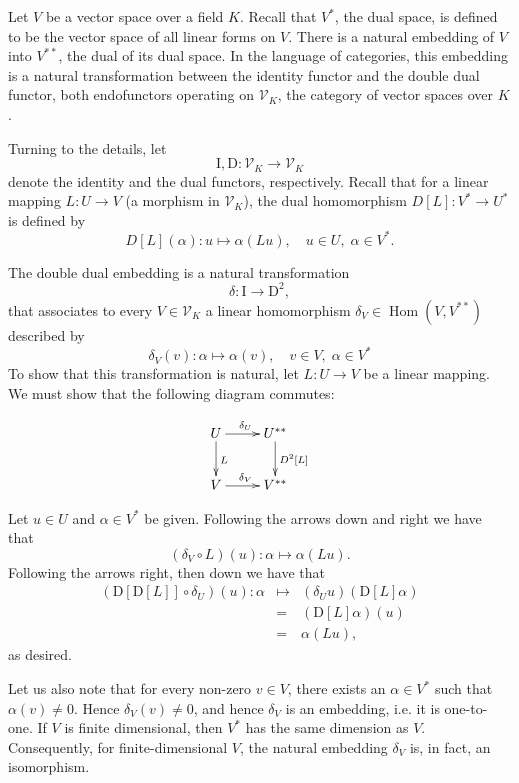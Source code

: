\documentclass[12pt]{article}
\begin{document}


\newcommand{\rI}{\mathrm{I}}
\newcommand{\rD}{\mathrm{D}}
\newcommand{\cV}{\mathcal{V}}
\newcommand{\Hom}{\operatorname{Hom}}

Let $V$ be a vector space over a field $K$.  Recall that $V^*$, the
dual space, is defined to be the vector space of all linear forms on
$V$.  There is a natural embedding of $V$ into $V^{**}$, the dual of
its dual space.  In the language of categories, this embedding is a
natural transformation between the identity functor and the double
dual functor, both endofunctors operating on $\mathcal{V}_K$, the category of
vector spaces over $K$.

Turning to the details, let 
\[\rI, \rD:\cV_K\rightarrow \cV_K\]
denote the identity and the dual functors, respectively.  Recall that for a
linear mapping $L:U\rightarrow V$ (a morphism in $\cV_K$), the dual
homomorphism $D[L]:V^*\rightarrow U^*$ is defined by
\[ D[L](\alpha): u \mapsto \alpha(Lu),\quad u\in U,\; \alpha\in V^*.\]

The double dual embedding is a natural transformation
\[\delta:\rI\rightarrow \rD^2,\]
that associates to every $V\in \cV_K$ a linear homomorphism
$\delta_V\in\operatorname{Hom}(V,V^{**})$ described by
\[\delta_V(v): \alpha\mapsto \alpha(v),\quad v\in V,\;\alpha\in V^*\]
To show that this transformation is natural, let $L:U\rightarrow
V$ be a linear mapping.  We must show that the following diagram
commutes:

$$
\xymatrix{%
U \ar[r]^{\delta_U} \ar[d]^L & U^{**} \ar[d]^{D^2[L]} \\
V \ar[r]^{\delta_V} & V^{**}
}
$$

Let $u\in U$ and $\alpha\in V^*$ be given.  Following the arrows down
and right we have that
$$(\delta_V\circ L)(u): \alpha\mapsto \alpha(Lu).$$
Following the arrows right, then down we have that
\begin{eqnarray*}
(\rD[\rD[L]]\circ \delta_U)(u):
\alpha &\mapsto& (\delta_U u)(\rD[L]\alpha) \\
&=& (\rD[L]\alpha)(u) \\
&=& \alpha(Lu),
\end{eqnarray*}
as desired.

Let us also note that for every non-zero $v\in V$, there exists an
$\alpha\in V^*$ such that $\alpha(v)\neq 0$. Hence $\delta_V(v)\neq
0$, and hence $\delta_V$ is an embedding, i.e. it is one-to-one.  If
$V$ is finite dimensional, then $V^*$ has the same dimension as $V$.
Consequently, for finite-dimensional $V$, the natural embedding
$\delta_V$ is, in fact, an isomorphism.
\end{document}
